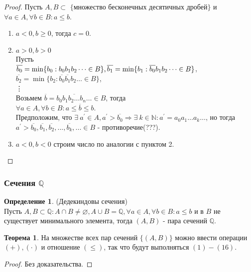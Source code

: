\documentclass[a4paper, 12pt]{article}
\newcommand{\N}{\mathbb{N}}
\newcommand{\Q}{\mathbb{Q}}
\renewcommand{\emptyset}{\varnothing}
\theoremstyle{definition}
\newtheorem*{definition}{Определение}
\newtheorem*{theorem}{Теорема}
\newtheorem*{comm}{Замечание}
\begin{document}
        \begin{proof}
            Пусть $A,B\subset$ $\{$множество бесконечных десятичных дробей$\}$ и $\forall a\in A, \forall b\in B: a\leq b$.
            \begin{enumerate}
                \item $a<0, b\geq 0$, тогда $c=0$.
                \item $a>0, b>0$\\
                Пусть\\
                $\overline{b_0}=\min \{b_0: b_0b_1b_2\dots \in B\},\\
                \overline{b_1}=\min \{b_1: \overline{b_0}b_1b_2\dots \in B\}$,\\
                $\overline{b_2}=\min \{b_2: \overline{b_0}\overline{b_1}b_2 \dots \in B\}$,\\
                \vdots \\
                Возьмем $\overline{b}= \overline{b_0b_1b_2\dots b_n \dots}\in B$, тогда\\
                $\forall a\in A, \forall b\in B: a\leq \overline{b}\leq b$.\\
                Предположим, что $\exists\ a^{\prime}\in A, a^{\prime}>\overline{b_0} \Rightarrow \exists\ k\in \N: a^{\prime}=a_0a_1\dots a_k\dots$, но тогда $a^{\prime}>\overline{b_0},\overline{b_1},\overline{b_2},...,\overline{b_k},...\in B$ - противоречие(???).
                \item $a<0, b<0$ строим число по аналогии с пунктом 2.
            \end{enumerate}
        \end{proof} 
    \subsubsection{Сечения $\Q$}
        \begin{definition} (Дедекиндовы сечения)\\
            Пусть $A,B\subset \Q: A\cap B\ne \emptyset, A\cup B=\Q, \forall a\in A, \forall b\in B: a\leq b$ и в $B$ не существует минимального элемента, тогда $(A,B)$ - пара сечений $\Q$.
        \end{definition} 
        \begin{theorem}
            На множестве всех пар сечений $\{(A,B)\}$ можно ввести операции $(+), (\cdot)$ и отношение $(\leq)$, так что будут выполняться $(1)-(16)$.
        \end{theorem} 
        \begin{proof}
            Без доказательства.
        \end{proof}
\end{document}
